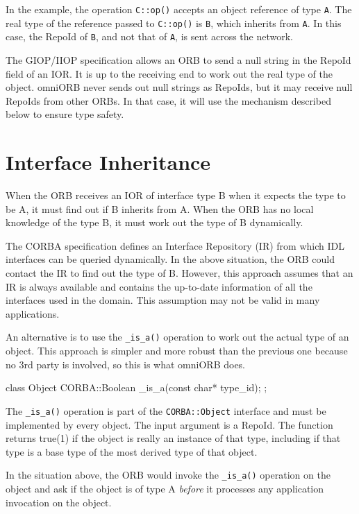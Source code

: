 \documentclass[11pt,twoside,a4paper]{book}
\newcommand{\type}[1]{\texttt{#1}}
\newcommand{\intf}[1]{\texttt{#1}}
\newcommand{\op}[1]{\texttt{#1()}}
\begin{document}
In the example, the operation \op{C::op} accepts an object reference
of type \type{A}. The real type of the reference passed to \op{C::op}
is \type{B}, which inherits from \type{A}. In this case, the RepoId of
\type{B}, and not that of \type{A}, is sent across the network.

The GIOP/IIOP specification allows an ORB to send a null string in the
RepoId field of an IOR. It is up to the receiving end to work out the
real type of the object. omniORB never sends out null strings as
RepoIds, but it may receive null RepoIds from other ORBs. In that
case, it will use the mechanism described below to ensure type safety.


\section{Interface Inheritance}

When the ORB receives an IOR of interface type B when it expects the
type to be A, it must find out if B inherits from A. When the ORB has
no local knowledge of the type B, it must work out the type of B
dynamically.

The CORBA specification defines an Interface Repository (IR) from
which IDL interfaces can be queried dynamically. In the above
situation, the ORB could contact the IR to find out the type of B.
However, this approach assumes that an IR is always available and
contains the up-to-date information of all the interfaces used in the
domain. This assumption may not be valid in many applications.

An alternative is to use the \op{\_is\_a} operation to work out the
actual type of an object. This approach is simpler and more robust
than the previous one because no 3rd party is involved, so this is
what omniORB does.

\begin{cxxlisting}
class Object{
    CORBA::Boolean _is_a(const char* type_id);
};
\end{cxxlisting}

The \op{\_is\_a} operation is part of the \intf{CORBA::Object}
interface and must be implemented by every object. The input argument
is a RepoId. The function returns true(1) if the object is really an
instance of that type, including if that type is a base type of the
most derived type of that object.

In the situation above, the ORB would invoke the \op{\_is\_a}
operation on the object and ask if the object is of type A
\emph{before} it processes any application invocation on the object.
\end{document}
